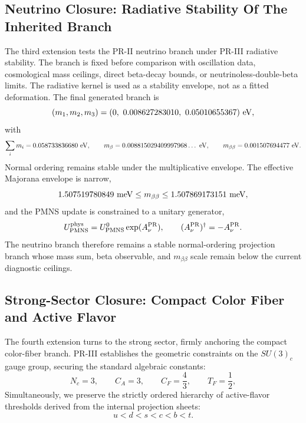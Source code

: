 \documentclass[11pt]{article}
\begin{document}
\subsection{Neutrino Closure: Radiative Stability Of The Inherited Branch}
\label{subsec:priii-neutrino-obligation}

The third extension tests the PR-II neutrino branch under PR-III radiative stability.  The branch is fixed before comparison with oscillation data, cosmological mass ceilings, direct beta-decay bounds, or neutrinoless-double-beta limits.  The radiative kernel is used as a stability envelope, not as a fitted deformation. The final generated branch is
\begin{equation}
(m_1,m_2,m_3)
=
(0,\ 0.008627283010,\ 0.05010655367)\ {\rm eV},
\end{equation}
with
\begin{equation}
\sum_i m_i=0.058733836680\ {\rm eV},
\qquad
m_\beta=0.008815029409997968\ldots\ {\rm eV},
\qquad
m_{\beta\beta}=0.001507694477\ {\rm eV}.
\end{equation}
Normal ordering remains stable under the multiplicative envelope.  The effective Majorana envelope is narrow,
\begin{equation}
1.507519780849\ {\rm meV}
\leq
m_{\beta\beta}
\leq
1.507869173151\ {\rm meV},
\end{equation}
and the PMNS \cite{Pontecorvo1957, MakiNakagawaSakata1962} update is constrained to a unitary generator,
\begin{equation}
U_{\rm PMNS}^{\rm phys}
=
U_{\rm PMNS}^{0}\exp(A_\nu^{\rm PR}),
\qquad
(A_\nu^{\rm PR})^\dagger=-A_\nu^{\rm PR}.
\end{equation}
The neutrino branch therefore remains a stable normal-ordering projection branch whose mass sum, beta observable, and \(m_{\beta\beta}\) scale remain below the current diagnostic ceilings.

\subsection{Strong-Sector Closure: Compact Color Fiber and Active Flavor}
\label{subsec:priii-strong-obligation}

The fourth extension turns to the strong sector, firmly anchoring the compact color-fiber branch. PR-III establishes the geometric constraints on the $SU(3)_c$ gauge group, securing the standard algebraic constants:
\begin{equation}
N_c=3,\qquad
C_A=3,\qquad
C_F=\frac43,\qquad
T_F=\frac12,
\end{equation}
Simultaneously, we preserve the strictly ordered hierarchy of active-flavor thresholds derived from the internal projection sheets:
\begin{equation}
u<d<s<c<b<t .
\end{equation}
\end{document}
